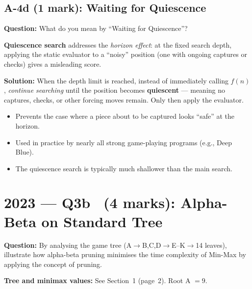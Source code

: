 \documentclass[12pt, a4paper]{article}
\newenvironment{answerbox}{\begin{mdframed}[style=answerframe]}{\end{mdframed}}
\begin{document}
\subsection{A-4d (1 mark): Waiting for Quiescence}

\textbf{Question:} What do you mean by ``Waiting for Quiescence''?

\begin{answerbox}
\textbf{Quiescence search} addresses the \textit{horizon effect}: at the fixed search depth, applying the static evaluator to a ``noisy'' position (one with ongoing captures or checks) gives a misleading score.

\textbf{Solution:} When the depth limit is reached, instead of immediately calling $f(n)$, \textit{continue searching} until the position becomes \textbf{quiescent} --- meaning no captures, checks, or other forcing moves remain. Only then apply the evaluator.

\begin{itemize}[noitemsep]
  \item Prevents the case where a piece about to be captured looks ``safe'' at the horizon.
  \item Used in practice by nearly all strong game-playing programs (e.g., Deep Blue).
  \item The quiescence search is typically much shallower than the main search.
\end{itemize}
\end{answerbox}

\section{2023 --- Q3b \ \normalfont(4 marks): Alpha-Beta on Standard Tree}

\textbf{Question:} By analysing the game tree (A$\to$B,C,D$\to$E--K$\to$14 leaves), illustrate how alpha-beta pruning minimises the time complexity of Min-Max by applying the concept of pruning.

\textbf{Tree and minimax values:} See Section~1 (page~2). Root A $= 9$.
\end{document}
